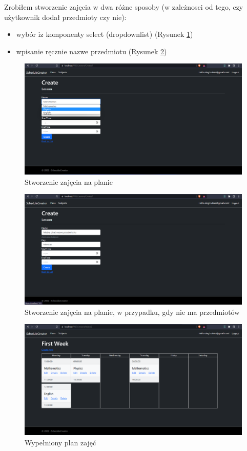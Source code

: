 \documentclass[a4paper,12pt,oneside]{book} %
\begin{document}
Zrobiłem stworzenie zajęcia w dwa różne sposoby (w zależnosci od tego, czy użytkownik dodał przedmioty czy nie):
\begin{itemize}
    \item wybór iz komponenty select (dropdownlist) (Rysunek \ref{ref:ddl})
    \item wpisanie ręcznie nazwe przedmiotu (Rysunek \ref{ref:moznapisac})
\end{itemize}
\begin{figure}[h]
    \centering\includegraphics[width=14cm]{18.png}
    \caption{Stworzenie zajęcia na planie}
    \label{ref:ddl}
\end{figure}

\begin{figure}[h]
    \centering\includegraphics[width=14cm]{moznapisac.png}
    \caption{Stworzenie zajęcia na planie, w przypadku, gdy nie ma przedmiotów}
    \label{ref:moznapisac}
\end{figure}

\begin{figure}[h]
    \centering\includegraphics[width=14cm]{20.png}
    \caption{Wypełniony plan zajęć}
\end{figure}
\end{document}
